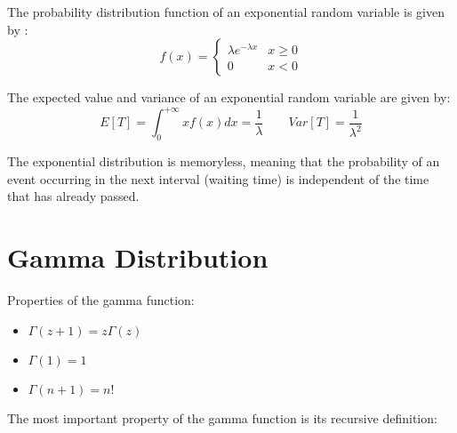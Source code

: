 The probability distribution function of an exponential random variable is given by :
\[
f(x) = 
\begin{cases}
    \lambda e^{-\lambda x} & x \geq 0 \\
    0 & x < 0
\end{cases}
\]

The expected value and variance of an exponential random variable are given by:
\[
E[T] = \int_{0}^{+\infty} x f(x) dx = \frac{1}{\lambda} \qquad Var[T] = \frac{1}{\lambda^2}
\]

The exponential distribution is memoryless, meaning that the probability of an event occurring in the next interval (waiting time) is independent of the time that has already passed.


\section{Gamma Distribution}


Properties of the gamma function:
\begin{itemize}
    \item $\Gamma(z+1) = z\Gamma(z)$
    \item $\Gamma(1) = 1$
    \item $\Gamma(n+1) = n!$
\end{itemize}

The most important property of the gamma function is its recursive definition:

